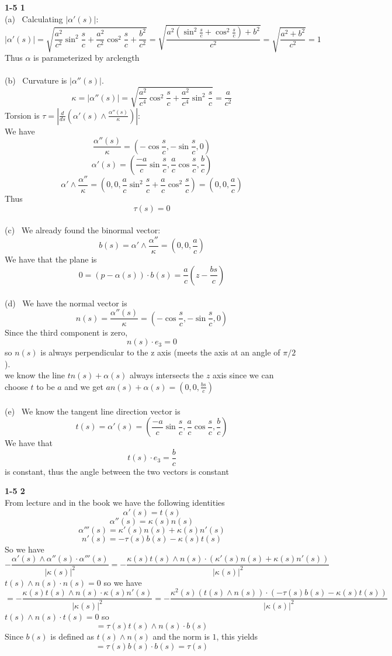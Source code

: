 \documentclass[12pt]{article}
\newenvironment{ques}[1]{\textbf{#1}\vspace{1 mm}\\ }{\bigskip}
\theoremstyle{definition}
\newcommand{\s}{\sin}
\renewcommand{\c}{\cos}
\renewcommand{\a}{\alpha}
\begin{document}
\begin{ques}{1-5 1}
	(a) \ Calculating $|\a '(s)|:$
	$$|\a'(s)| = \sqrt{\frac{a^2}{c^2}\sin^2 \frac s c + \frac{a^2}{c^2}\cos^2
	\frac s c + \frac {b^2}{c^2}} = \sqrt{\frac{a^2(\s^2\frac s c + \c^2\frac s
	c) + b^2}{c^2}} = \sqrt{ \frac{a^2 + b^2}{c^2}} = 1$$
	Thus $\a$ is parameterized by arclength\\
	\\
	(b) \ Curvature is $|\a''(s)|$. 
	$$\kappa = |\a''(s)| = \sqrt{\frac{a^2}{c^4}\cos^2 \frac s c + \frac{a^2}{c^4}\sin^2
	\frac s c} = \frac a {c^2}$$
	Torsion is $\tau = |\frac d {ds}(\a'(s) \wedge \frac{\a''(s)}{\kappa})|$:\\
	We have
	$$\frac {\a''(s)}{\kappa} = (-\cos\frac s c, -\sin \frac s c, 0)$$
	$$\a'(s) = (\frac{-a}{c}\sin \frac s c, \frac a c \cos \frac s c, \frac b c)$$
	$$\a' \wedge \frac {\a''}{\kappa} = (0,0,\frac a c \sin^2 \frac s c + \frac
	a c \cos^2 \frac s c) = (0,0,\frac a c)$$
	Thus 
	$$\tau(s) = 0$$
	\\
	(c) \ We already found the binormal vector:
	$$b(s) = \a' \wedge \frac {\a''}{\kappa} = (0,0,\frac a c)$$
	We have that the plane is
	$$0 = (p - \a(s)) \cdot b(s) = \frac a c (z - \frac{bs}{c})$$
	\\
	(d) \ We have the normal vector is
	$$n(s) = \frac{\a''(s)}{\kappa} = (-\c \frac s c, - \s \frac s c, 0)$$
	Since the third component is zero,
	$$n(s) \cdot e_3 = 0$$
	so $n(s)$ is always perpendicular to the z axis (meets the axis at an angle
	of $\pi/2$).\\
	we know the line $tn(s) + \a(s)$ always intersects the $z$ axis since we
	can choose $t$ to be $a$ and we get $an(s) + \a(s) = (0,0,\frac{bs}{c})$\\
	\\
	(e) \ We know the tangent line direction vector is
	$$t(s) = \a'(s) = (\frac{-a}{c}\sin \frac s c, \frac a c \cos \frac s c, \frac b c)$$
	We have that
	$$t(s) \cdot e_3 = \frac b c$$
	is constant, thus the angle between the two vectors is constant
\end{ques}

\begin{ques}{1-5 2}
	From lecture and in the book we have the following identities
	$$\a'(s) = t(s)$$
	$$\a''(s) = \kappa(s)n(s)$$
	$$\a'''(s) = \kappa'(s)n(s) + \kappa(s)n'(s)$$
	$$n'(s) = -\tau(s)b(s) - \kappa(s)t(s)$$
	So we have
	$$-\frac{\a'(s) \wedge \a''(s) \cdot \a'''(s)}{|\kappa(s)|^2} = -\frac{\kappa(s)t(s)
	\wedge n(s) \cdot (\kappa'(s)n(s) + \kappa(s)n'(s))}{|\kappa(s)|^2}$$
	$t(s) \wedge n(s) \cdot n(s) = 0$ so we have
	$$= - \frac{\kappa(s)t(s) \wedge n(s) \cdot \kappa(s)n'(s)}{|\kappa(s)|^2} =
	- \frac{\kappa^2(s)(t(s) \wedge n(s)) \cdot (-\tau(s)b(s) -
	\kappa(s)t(s))}{|\kappa(s)|^2}$$
	$t(s) \wedge n(s) \cdot t(s) = 0$ so
	$$= \tau(s) t(s) \wedge n(s) \cdot b(s)$$
	Since $b(s)$ is defined as $t(s) \wedge n(s)$ and the norm is $1$, this yields
	$$= \tau(s)b(s) \cdot b(s) = \tau(s)$$

\end{ques}
\end{document}
